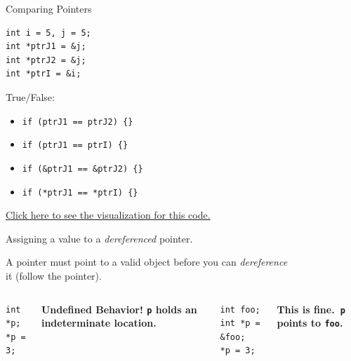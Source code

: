 \documentclass[14pt,aspectratio=1610]{beamer}
\begin{document}
\begin{frame}[fragile]{Comparing Pointers}

\begin{lstlisting}
int i = 5, j = 5;
int *ptrJ1 = &j;
int *ptrJ2 = &j;
int *ptrI = &i;
\end{lstlisting}


True/False:
\begin{itemize}
\item
  \lstinline|if (ptrJ1 == ptrJ2) {}  | 
\item <3->
  \lstinline|if (ptrJ1 == ptrI) {}   | 
\item <5->
  \lstinline|if (&ptrJ1 == &ptrJ2) {}| 
\item <7->
  \lstinline|if (*ptrJ1 == *ptrI) {} | 
\end{itemize}

\href{https://pythontutor.com/visualize.html#code=%23include%20%3Ciostream%3E%0A%0Aint%20main%28%29%0A%7B%0A%20%20int%20i%20%3D%205,%20j%20%3D%205%3B%0A%20%20int%20*ptrJ1%20%3D%20%26j%3B%0A%20%20int%20*ptrJ2%20%3D%20%26j%3B%0A%20%20int%20*ptrI%20%3D%20%26i%3B%0A%20%20%0A%20%20if%20%28ptrJ1%20%3D%3D%20ptrJ2%29%20%7B%0A%20%20%20%20std%3A%3Acout%20%3C%3C%201%20%3C%3C%20'%20'%3B%0A%20%20%7D%0A%20%20if%20%28ptrJ1%20%3D%3D%20ptrI%29%20%7B%0A%20%20%20%20std%3A%3Acout%20%3C%3C%202%20%3C%3C%20'%20'%3B%0A%20%20%7D%0A%20%20if%20%28%26ptrJ1%20%3D%3D%20%26ptrJ2%29%20%7B%0A%20%20%20%20std%3A%3Acout%20%3C%3C%203%20%3C%3C%20'%20'%3B%0A%20%20%7D%0A%20%20if%20%28*ptrJ1%20%3D%3D%20*ptrI%29%20%7B%0A%20%20%20%20std%3A%3Acout%20%3C%3C%204%20%3C%3C%20'%20'%3B%0A%20%20%7D%0A%0A%20%20return%200%3B%0A%7D&cumulative=false&curInstr=0&heapPrimitives=nevernest&mode=display&origin=opt-frontend.js&py=cpp_g%2B%2B9.3.0&rawInputLstJSON=%5B%5D&textReferences=false}{Click here to see the visualization for this code.}
\end{frame}

\begin{frame}[fragile]{Assigning a value to a \textit{dereferenced} pointer.}

A pointer must point to a valid object before you can \textit{dereference}\\ it (follow
the pointer).\\[1em]

\begin{columns}[T]
\begin{lstlisting}
int *p;
*p = 3;
\end{lstlisting}
  \pause%
  \centering\textbf{Undefined Behavior! \texttt{p} holds an indeterminate location.}
  \pause%
\begin{lstlisting}
int foo;
int *p = &foo;
*p = 3;
\end{lstlisting}
  \pause%
  \centering\textbf{This is fine.\ \lstinline{p} points to \lstinline{foo}.}
\end{columns}
\end{frame}
\end{document}

